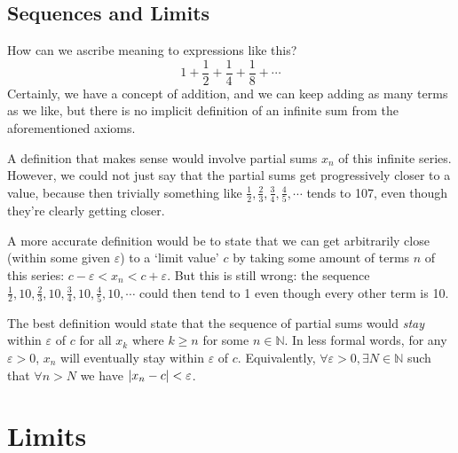 \documentclass{article}
\begin{document}
\subsection{Sequences and Limits}
How can we ascribe meaning to expressions like this?
\[ 1 + \frac{1}{2} + \frac{1}{4} + \frac{1}{8} + \cdots \]
Certainly, we have a concept of addition, and we can keep adding as many terms as we like, but there is no implicit definition of an infinite sum from the aforementioned axioms.

A definition that makes sense would involve partial sums $x_n$ of this infinite series. However, we could not just say that the partial sums get progressively closer to a value, because then trivially something like $\frac{1}{2}, \frac{2}{3}, \frac{3}{4}, \frac{4}{5}, \cdots$ tends to 107, even though they're clearly getting closer.

A more accurate definition would be to state that we can get arbitrarily close (within some given $\varepsilon$) to a `limit value' $c$ by taking some amount of terms $n$ of this series: $c - \varepsilon < x_n < c + \varepsilon$. But this is still wrong: the sequence $\frac{1}{2}, 10, \frac{2}{3}, 10, \frac{3}{4}, 10, \frac{4}{5}, 10, \cdots$ could then tend to 1 even though every other term is 10.

The best definition would state that the sequence of partial sums would \textit{stay} within $\varepsilon$ of $c$ for all $x_k$ where $k \geq n$ for some $n \in \mathbb N$. In less formal words, for any $\varepsilon > 0$, $x_n$ will eventually stay within $\varepsilon$ of $c$. Equivalently, $\forall \varepsilon > 0, \exists N \in \mathbb N$ such that $\forall n > N$ we have $\abs{x_n - c} < \varepsilon$.

\section{Limits}
\end{document}
